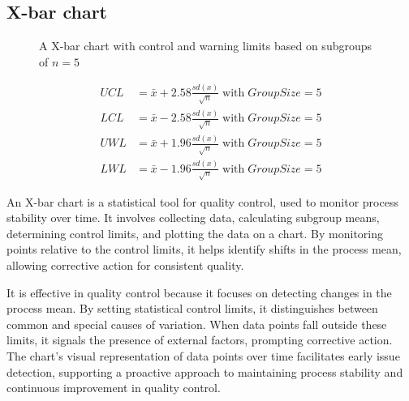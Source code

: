 \documentclass[
  a4paper,
]{scrbook}
\begin{document}
\subsection{X-bar chart}\label{x-bar-chart}

\begin{figure}[H]


\caption{\label{fig-xbar}A X-bar chart with control and warning limits
based on subgroups of \(n=5\)}

\end{figure}%

\begin{align}
UCL &= \bar{x} + 2.58\frac{sd(x)}{\sqrt{n}} \;\text{with}\;GroupSize=5 \\
LCL &= \bar{x} - 2.58\frac{sd(x)}{\sqrt{n}} \;\text{with}\;GroupSize=5 \\
UWL &= \bar{x} + 1.96\frac{sd(x)}{\sqrt{n}} \;\text{with}\;GroupSize=5 \\
LWL &= \bar{x} - 1.96\frac{sd(x)}{\sqrt{n}} \;\text{with}\;GroupSize=5
\end{align}

An X-bar chart is a statistical tool for quality control, used to
monitor process stability over time. It involves collecting data,
calculating subgroup means, determining control limits, and plotting the
data on a chart. By monitoring points relative to the control limits, it
helps identify shifts in the process mean, allowing corrective action
for consistent quality.

It is effective in quality control because it focuses on detecting
changes in the process mean. By setting statistical control limits, it
distinguishes between common and special causes of variation. When data
points fall outside these limits, it signals the presence of external
factors, prompting corrective action. The chart's visual representation
of data points over time facilitates early issue detection, supporting a
proactive approach to maintaining process stability and continuous
improvement in quality control.
\end{document}
